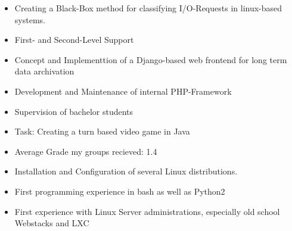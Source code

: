 \documentclass[10pt,a4paper,ragged2e,withhyper]{altacv}
\begin{document}
\begin{paracol}{2}

\medskip
\begin{itemize}
\item Creating a Black-Box method for classifying I/O-Requests in linux-based systems.
\end{itemize}

\divider
{}
\medskip
\begin{itemize}
\item First- and Second-Level Support
\item Concept and Implementtion of a Django-based web frontend for long term data archivation
\end{itemize}

\divider

\medskip
\begin{itemize}
\item Development and Maintenance of internal PHP-Framework
\end{itemize}

\divider

\medskip
\begin{itemize}
\item Supervision of bachelor students
\item Task: Creating a turn based video game in Java
\item Average Grade my groups recieved: 1.4
\end{itemize}

\divider

\begin{itemize}
\item Installation and Configuration of several Linux distributions.
\item First programming experience in bash as well as Python2
\item First experience with Linux Server administrations, especially old school Webstacks and LXC
\end{itemize}



\end{paracol}
\end{document}
